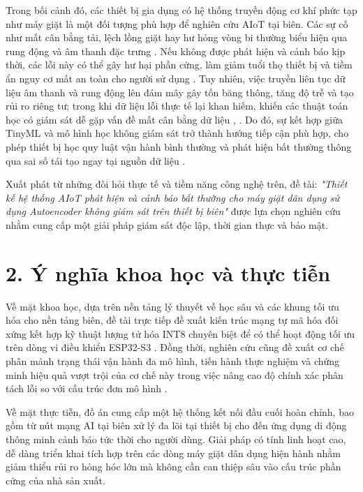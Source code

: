 Trong bối cảnh đó, các thiết bị gia dụng có hệ thống truyền động cơ khí phức tạp như máy giặt là một đối tượng phù hợp để nghiên cứu AIoT tại biên. Các sự cố như mất cân bằng tải, lệch lồng giặt hay hư hỏng vòng bi thường biểu hiện qua rung động và âm thanh đặc trưng \cite{ref_1_3}. Nếu không được phát hiện và cảnh báo kịp thời, các lỗi này có thể gây hư hại phần cứng, làm giảm tuổi thọ thiết bị và tiềm ẩn nguy cơ mất an toàn cho người sử dụng \cite{ref_1_3}. Tuy nhiên, việc truyền liên tục dữ liệu âm thanh và rung động lên đám mây gây tốn băng thông, tăng độ trễ và tạo rủi ro riêng tư; trong khi dữ liệu lỗi thực tế lại khan hiếm, khiến các thuật toán học có giám sát dễ gặp vấn đề mất cân bằng dữ liệu \cite{ref_1_1}, \cite{ref_1_5}. Do đó, sự kết hợp giữa TinyML và mô hình học không giám sát trở thành hướng tiếp cận phù hợp, cho phép thiết bị học quy luật vận hành bình thường và phát hiện bất thường thông qua sai số tái tạo ngay tại nguồn dữ liệu \cite{ref_1_1, ref_1_4}.

Xuất phát từ những đòi hỏi thực tế và tiềm năng công nghệ trên, đề tài: \textit{"Thiết kế hệ thống AIoT phát hiện và cảnh báo bất thường cho máy giặt dân dụng sử dụng Autoencoder không giám sát trên thiết bị biên"} được lựa chọn nghiên cứu nhằm cung cấp một giải pháp giám sát độc lập, thời gian thực và bảo mật.

\section*{2. Ý nghĩa khoa học và thực tiễn}
Về mặt khoa học, dựa trên nền tảng lý thuyết về học sâu và các khung tối ưu hóa cho nền tảng biên, đề tài trực tiếp đề xuất kiến trúc mạng tự mã hóa đối xứng kết hợp kỹ thuật lượng tử hóa INT8 chuyên biệt để có thể hoạt động tối ưu trên dòng vi điều khiển ESP32-S3 \cite{ref_1_6, ref_1_7}. Đồng thời, nghiên cứu cũng đề xuất cơ chế phân mảnh trạng thái vận hành đa mô hình, tiến hành thực nghiệm và chứng minh hiệu quả vượt trội của cơ chế này trong việc nâng cao độ chính xác phân tách lỗi so với cấu trúc đơn mô hình \cite{ref_1_7}.

Về mặt thực tiễn, đồ án cung cấp một hệ thống kết nối đầu cuối hoàn chỉnh, bao gồm từ nút mạng AI tại biên xử lý đa lõi tại thiết bị cho đến ứng dụng di động thông minh cảnh báo tức thời cho người dùng. Giải pháp có tính linh hoạt cao, dễ dàng triển khai tích hợp trên các dòng máy giặt dân dụng hiện hành nhằm giảm thiểu rủi ro hỏng hóc lớn mà không cần can thiệp sâu vào cấu trúc phần cứng của nhà sản xuất.

